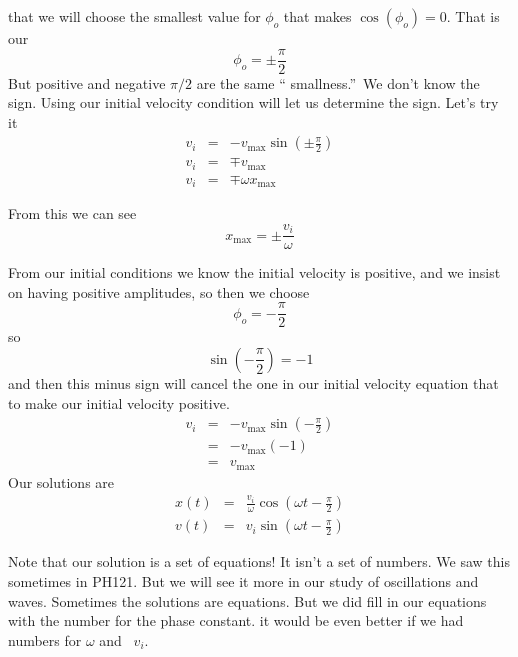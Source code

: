 \documentclass{book}
\begin{document}
that we will choose the smallest value for $\phi _{o}$ that makes $\cos
\left( \phi _{o}\right) =0.$ That is our%
\begin{equation*}
\phi _{o}=\pm \frac{\pi }{2}
\end{equation*}%
But positive and negative $\pi /2$ are the same \textquotedblleft
smallness.\textquotedblright\ We don't know the sign. Using our initial
velocity condition will let us determine the sign. Let's try it 
\begin{eqnarray*}
v_{i} &=&-v_{\max }\sin \left( \pm \frac{\pi }{2}\right) \\
v_{i} &=&\mp v_{\max } \\
v_{i} &=&\mp \omega x_{\max }
\end{eqnarray*}

From this we can see 
\begin{equation*}
x_{\max }=\pm \frac{v_{i}}{\omega }
\end{equation*}

From our initial conditions we know the initial velocity is positive, and we
insist on having positive amplitudes, so then we choose 
\begin{equation*}
\phi _{o}=-\frac{\pi }{2}
\end{equation*}%
so\ 
\begin{equation*}
\sin \left( -\frac{\pi }{2}\right) =\allowbreak -1
\end{equation*}%
and then this minus sign will cancel the one in our initial velocity
equation that to make our initial velocity positive.%
\begin{eqnarray*}
v_{i} &=&-v_{\max }\sin \left( -\frac{\pi }{2}\right) \\
&=&-v_{\max }\left( -1\right) \\
&=&v_{\max }
\end{eqnarray*}%
Our solutions are%
\begin{eqnarray*}
x\left( t\right) &=&\frac{v_{i}}{\omega }\cos \left( \omega t-\frac{\pi }{2}%
\right) \\
v\left( t\right) &=&v_{i}\sin \left( \omega t-\frac{\pi }{2}\right)
\end{eqnarray*}

Note that our solution is a set of equations! It isn't a set of numbers. We
saw this sometimes in PH121. But we will see it more in our study of
oscillations and waves. Sometimes the solutions are equations. But we did
fill in our equations with the number for the phase constant. it would be
even better if we had numbers for $\omega $ and \ $v_{i}.$
\end{document}

